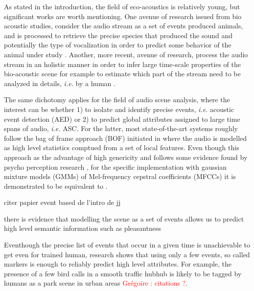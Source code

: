 \documentclass[journal]{IEEEtran}
\newcommand{\gl}[1]{\textcolor{red}{Gr\'egoire : #1}}
\begin{document}
As stated in the introduction, the field of eco-acoustics is relatively young, but significant works are worth mentioning. One avenue of research issued from bio acoustic studies, consider the audio stream as a set of events produced animals, and is processed to retrieve the precise species that produced the sound and potentially the type of vocalization in order to predict some behavior of the animal under study \cite{dan}. Another, more recent, avenue of research, process the audio stream in an holistic manner in order to infer large time-scale properties of the bio-acoustic scene for example to estimate which part of the stream need to be analyzed in details, \textit{i.e.} by a human \cite{australians}.

The same dichotomy applies for the field of audio scene analysis, where the interest can be whether 1) to isolate and identify precise events, \textit{i.e.} acoustic event detection (AED) or 2) to predict global attributes assigned to large time spans of audio, \textit{i.e.} ASC. For the latter, most state-of-the-art systems roughly follow the bag of frame approach (BOF) initiated in \cite{aucouturier2007bag} where the audio is modelled as high level statistics comptued from a set of local features. Even though this approach as the advantage of high genericity and follows some evidence found by psycho perception research \cite{macdermott}, for the specific implementation with gaussian mixture models (GMMs) of Mel-frequency cepstral coefficients (MFCCs) it is demonstrated to be equivalent to  \cite{lagrange:hal-01082501}.

citer papier event based de l'intro de jj

 there is evidence that modelling the scene as a set of events allows us to predict high level semantic information such as pleasantness

Eventhough the precise list of events that occur in a given time is unachievable to get even for trained human, research shows that using only a few events, so called markers \cite{} is enough to reliably predict high level attributes. For example, the presence of a few bird calls in a smooth traffic hubhub is likely to be tagged by humans as a park scene in urban areas \gl{citations ?}.
\end{document}
